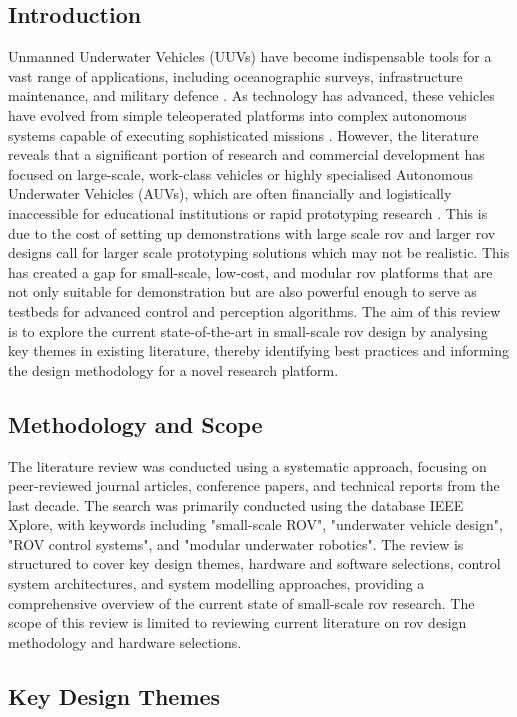 \documentclass[11pt, a4paper]{article}
\begin{document}
\subsection{Introduction}
Unmanned Underwater Vehicles (UUVs) have become indispensable tools for a vast range of applications, including oceanographic surveys, infrastructure maintenance, and military defence \cite{Coccolo2023716, article}. As technology has advanced, these vehicles have evolved from simple teleoperated platforms into complex autonomous systems capable of executing sophisticated missions \cite{Coccolo2023716}. However, the literature reveals that a significant portion of research and commercial development has focused on large-scale, work-class vehicles or highly specialised Autonomous Underwater Vehicles (AUVs), which are often financially and logistically inaccessible for educational institutions or rapid prototyping research \cite{9659412}. This is due to the cost of setting up demonstrations with large scale \gls{rov} and larger \gls{rov} designs call for larger scale prototyping solutions which may not be realistic. This has created a gap for small-scale, low-cost, and modular \gls{rov} platforms that are not only suitable for demonstration but are also powerful enough to serve as testbeds for advanced control and perception algorithms. The aim of this review is to explore the current state-of-the-art in small-scale \gls{rov} design by analysing key themes in existing literature, thereby identifying best practices and informing the design methodology for a novel research platform.

\subsection{Methodology and Scope}
The literature review was conducted using a systematic approach, focusing on peer-reviewed journal articles, conference papers, and technical reports from the last decade. The search was primarily conducted using the database IEEE Xplore, with keywords including "small-scale ROV", "underwater vehicle design", "ROV control systems", and "modular underwater robotics". The review is structured to cover key design themes, hardware and software selections, control system architectures, and system modelling approaches, providing a comprehensive overview of the current state of small-scale \gls{rov} research. The scope of this review is limited to reviewing current literature on \gls{rov} design methodology and hardware selections.

\subsection{Key Design Themes}
\end{document}
